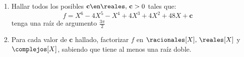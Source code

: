 \def\c{\textbf{c}}

\begin{enunciado}{\ejExtra}
  \begin{enumerate}[label=\alph*)]
    \item Hallar todos los posibles $\c \en \reales,\, \c > 0$ tales que:
          $$
            f = X^6 - 4X^5 - X^4 + 4X^3 + 4X^2 + 48X + \c
          $$ tenga una raíz de argumento $\frac{3\pi}{2}$

    \item Para cada valor de $\c$ hallado, factorizar $f$ en $\racionales[X],\, \reales[X]$ y $\complejos[X]$, sabiendo que tiene al menos una raíz doble.
  \end{enumerate}

\end{enunciado}

